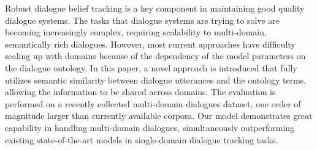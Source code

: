 Robust dialogue belief tracking is a key component in maintaining good quality dialogue systems. The tasks that dialogue systems are trying to solve are becoming increasingly complex, requiring scalability to multi-domain, semantically rich dialogues. However, most current approaches have difficulty scaling up with domains because of the dependency of the model parameters on the dialogue ontology. In this paper, a novel approach is introduced that fully utilizes semantic similarity between dialogue utterances and the ontology terms, allowing the information to be shared across domains. The evaluation is performed on a recently collected multi-domain dialogues dataset, one order of magnitude larger than currently available corpora. Our model demonstrates great capability in handling multi-domain dialogues, simultaneously outperforming existing state-of-the-art models in single-domain dialogue tracking tasks.
